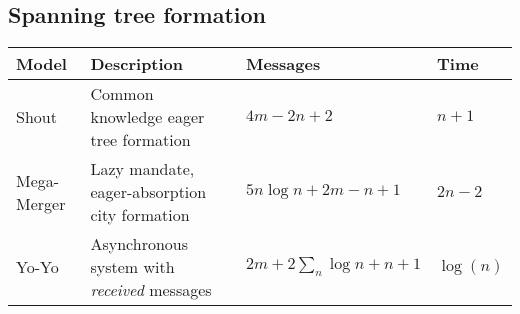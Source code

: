 \subsection{Spanning tree formation}
\begin{table}[h]
\begin{tabular}{llll}
			\textbf{Model}		& \textbf{Description}						& \textbf{Messages}						& \textbf{Time} \\
	\hline 	Shout 				& Common knowledge eager tree formation		& $4m - 2n + 2$							& $n + 1$ \\
	\hline 	Mega-Merger 		& Lazy mandate, eager-absorption city formation
																			& $5n \log{n} + 2m - n + 1$				& $2n - 2$ \\
	\hline 	Yo-Yo				& Asynchronous system with \emph{received} messages
																			& $2m + 2\sum_{n}{\log{n}} + n + 1$		& $\log(n)$ \\
\end{tabular}
\end{table}